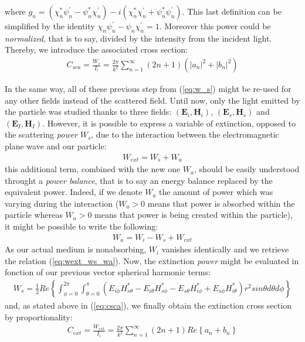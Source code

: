 \documentclass{article}
\numberwithin{equation}{section}
\begin{document}
where $g_{n}=(\chi^{*}_{n}\psi^{'}_{n}-\psi^{*}_{n}\chi^{'}_{n})-i(\chi^{*}_{n}\chi^{'}_{n}+\psi^{*}_{n}\psi^{'}_{n})$. This last definition can be simplified by the identity $\chi_{n}\psi^{'}_{n}-\psi_{n}\chi^{'}_{n}=1$. Moreover this power could be \textit{normalized}, that is to say, divided by the intensity from the incident light. Thereby, we introduce the associated cross section:
\begin{align}\label{eq:csca}
C_{sca}=\frac{W_{s}}{I_{i}}=\frac{2\pi}{k^{2}}\sum_{n=1}^{\infty }(2n+1)(\left| a_{n} \right|^{2}+\left| b_{n} \right|^{2})
\end{align}

In the same way, all of these previous step from (\ref{eq:w_s}) might be re-used for any other fields instead of the scattered field. Until now, only the light emitted by the particle was studied thanks to three fields: $(\textbf{E}_{i}, \textbf{H}_{i})$, $(\textbf{E}_{s}, \textbf{H}_{s})$ and $(\textbf{E}_{I}, \textbf{H}_{I})$. However, it is possible to express a variable of extinction, opposed to the scattering \textit{power} $W_{s}$, due to the interaction between the electromagnetic plane wave and our particle:
\begin{align}\label{eq:wext_ws_wa}
W_{ext} = W_{s} + W_{a}
\end{align}
this additional term, combined with the new one $W_{a}$, should be easily understood throught a \textit{power balance}, that is to say an energy balance replaced by the equivalent power. Indeed, if we denote $W_{a}$ the amount of power which was varying during the interaction ($W_{a} > 0$ means that power is absorbed within the particle whereas $W_{a} > 0$ means that power is being created within the particle), it might be possible to write the following:
\begin{align}
W_{a} = W_{i} - W_{s} + W_{ext}
\end{align}
As our actual medium is nonabsorbing, $W_{i}$ vanishes identically and we retrieve the relation (\ref{eq:wext_ws_wa}). Now, the extinction \textit{power} might be evaluated in fonction of our previous vector spherical harmonic terms:
\begin{align}
W_{s}=\frac{1}{2}Re\left\{ \int_{\phi=0}^{2\pi}\int_{\theta=0}^{\pi} (E_{i\phi}H^{*}_{s\theta} - E_{i\theta}H^{*}_{s\phi} - E_{s\theta}H^{*}_{i\phi} + E_{s\phi}H^{*}_{i\theta})r^{2}sin\theta d\theta d\phi\right\}
\end{align}
and, as stated above in (\ref{eq:csca}), we finally obtain the extinction cross section by proportionality:
\begin{align}
C_{ext}=\frac{W_{ext}}{I_{i}}=\frac{2\pi}{k^{2}}\sum_{n=1}^{\infty }(2n+1)Re\left\{a_{n} + b_{n} \right\}
\end{align}
\end{document}
